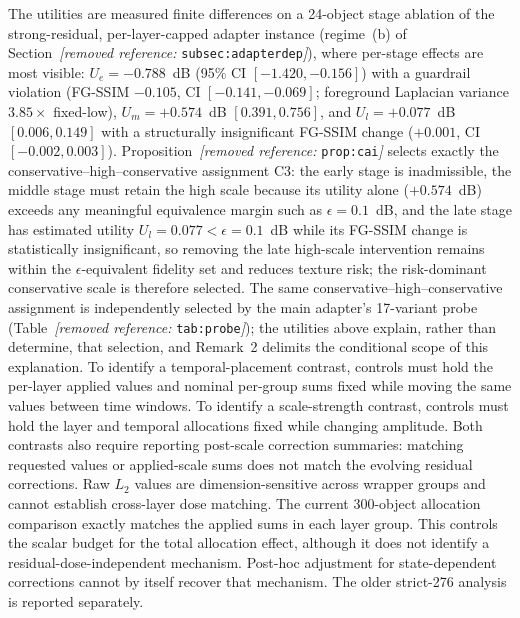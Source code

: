 \documentclass[times,twocolumn,final]{elsarticle}
\providecommand{\DIFadd}[1]{{\protect\color{blue} \sf #1}} %
\providecommand{\DIFdel}[1]{{\protect\color{red} \scriptsize #1}} %
\providecommand{\DIFaddbegin}{} %
\providecommand{\DIFaddend}{} %
\providecommand{\DIFdelbegin}{} %
\providecommand{\DIFdelend}{} %
\begin{document}
\DIFdelbegin %
\DIFdel{The utilities are measured finite differences on a 24-object stage ablation of the strong-residual, per-layer-capped adapter instance (regime~(b) of Section~\textit{[removed reference: }\texttt{subsec:adapterdep}\textit{]}), where per-stage effects are most visible: $U_e=-0.788$~dB (95\% CI $[-1.420,-0.156]$) with a guardrail violation (FG-SSIM $-0.105$, CI $[-0.141,-0.069]$; foreground Laplacian variance $3.85\times$ fixed-low), $U_m=+0.574$~dB $[0.391,0.756]$, and $U_l=+0.077$~dB $[0.006,0.149]$ with a structurally insignificant FG-SSIM change ($+0.001$, CI $[-0.002,0.003]$). Proposition~\textit{[removed reference: }\texttt{prop:cai}\textit{]} selects exactly the conservative--high--conservative assignment C3: the early stage is inadmissible, the middle stage must retain the high scale because its utility alone ($+0.574$~dB) exceeds any meaningful equivalence margin such as $\epsilon=0.1$~dB, and the late stage has estimated utility $U_l=0.077<\epsilon=0.1$~dB while its FG-SSIM change is statistically insignificant, so removing the late high-scale intervention remains within the $\epsilon$-equivalent fidelity set and reduces texture risk; the risk-dominant conservative scale is therefore selected. The same conservative--high--conservative assignment is independently selected by the main adapter's 17-variant probe (Table~\textit{[removed reference: }\texttt{tab:probe}\textit{]}); the utilities above explain, rather than determine, that selection, and Remark~2 delimits the conditional scope of this explanation.
}%
\DIFdelend \DIFaddbegin \DIFadd{To identify a temporal-placement contrast, controls must hold the per-layer applied values and nominal per-group sums fixed while moving the same values between time windows. To identify a scale-strength contrast, controls must hold the layer and temporal allocations fixed while changing amplitude. Both contrasts also require reporting post-scale correction summaries: matching requested values or applied-scale sums does not match the evolving residual corrections. Raw $L_2$ values are dimension-sensitive across wrapper groups and cannot establish cross-layer dose matching. The current 300-object allocation comparison exactly matches the applied sums in each layer group. This controls the scalar budget for the total allocation effect, although it does not identify a residual-dose-independent mechanism. Post-hoc adjustment for state-dependent corrections cannot by itself recover that mechanism. The older strict-276 analysis is reported separately.
}\DIFaddend 
\end{document}
